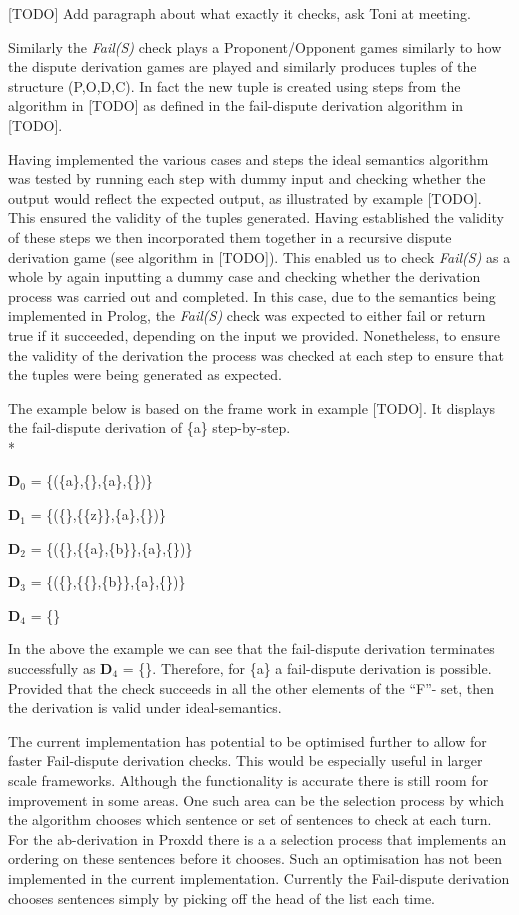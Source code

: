 [TODO] Add paragraph about what exactly it checks, ask Toni at meeting.

Similarly the \emph{Fail(S)} check plays a Proponent/Opponent games similarly to how the dispute derivation games are played and similarly produces tuples of the structure (P,O,D,C). In fact the new tuple is created using steps from the algorithm in [TODO] as defined in the fail-dispute derivation algorithm in [TODO].

Having implemented the various cases and steps the ideal semantics algorithm was tested by running each step with dummy input and checking whether the output would reflect the expected output, as illustrated by example [TODO]. This ensured the validity of the tuples generated. Having established the validity of these steps we then incorporated them together in a recursive dispute derivation game (see algorithm in [TODO]). This enabled us to check \emph{Fail(S)} as a whole by again inputting a dummy case and checking whether the derivation process was carried out and completed. In this case, due to the semantics being implemented in Prolog, the \emph{Fail(S)} check was expected to either fail or return true if it succeeded, depending on the input we provided. Nonetheless, to ensure the validity of the derivation the process was checked at each step to ensure that the tuples were being generated as expected.

\begin{exmp} The example below is based on the frame work in example [TODO]. It displays the fail-dispute derivation of \{a\} step-by-step.
\\*

$\mathbf{D}_0$ = \{(\{a\},\{\},\{a\},\{\})\}

$\mathbf{D}_1$ = \{(\{\},\{\{z\}\},\{a\},\{\})\}

$\mathbf{D}_2$ = \{(\{\},\{\{a\},\{b\}\},\{a\},\{\})\}

$\mathbf{D}_3$ = \{(\{\},\{\{\},\{b\}\},\{a\},\{\})\}

$\mathbf{D}_4$ = \{\}

\end{exmp}

In the above the example we can see that the fail-dispute derivation terminates successfully as $\mathbf{D}_4$ = \{\}. Therefore, for \{a\} a fail-dispute derivation is possible. Provided that the check succeeds in all the other elements of the ``F''- set, then the derivation is valid under ideal-semantics.

The current implementation has potential to be optimised further to allow for faster Fail-dispute derivation checks. This would be especially useful in larger scale frameworks. Although the functionality is accurate there is still room for improvement in some areas. One such area can be the selection process by which the algorithm chooses which sentence or set of sentences to check at each turn. For the ab-derivation in Proxdd there is a a selection process that implements an ordering on these sentences before it chooses. Such an optimisation has not been implemented in the current implementation. Currently the Fail-dispute derivation chooses sentences simply by picking off the head of the list each time.


